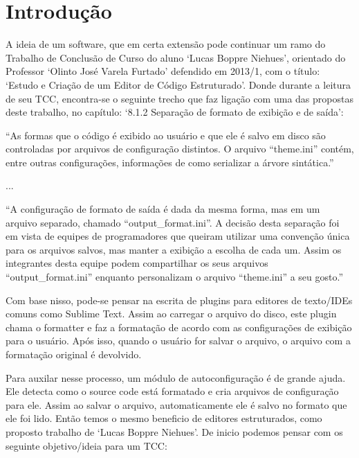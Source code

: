 



\section{Introdução}

    \hspace*{5mm}

    A ideia de um software, que em certa extensão pode continuar um ramo do Trabalho de Conclusão de
    Curso do aluno `Lucas Boppre Niehues', orientado do Professor `Olinto José Varela Furtado'
    defendido em 2013/1, com o título: `Estudo e Criação de um Editor de Código Estruturado'. Donde
    durante a leitura de seu TCC, encontra-se o seguinte trecho que faz ligação com uma das
    propostas deste trabalho, no capítulo: `8.1.2 Separação de formato de exibição e de saída':

    \medskip
    \begin{myquote}
    ``As formas que o código é exibido ao usuário e que ele é salvo em disco são controladas
    por arquivos de configuração distintos. O arquivo ``theme.ini'' contém, entre outras
    configurações, informações de como serializar a árvore sintática.''
    \end{myquote}

    \vspace{-5mm}
    ...
    \begin{myquote}
    ``A configuração de formato de saída é dada da mesma forma, mas em um arquivo
    separado, chamado ``output\_format.ini''. A decisão desta separação foi em vista de equipes
    de programadores que queiram utilizar uma convenção única para os arquivos salvos,
    mas manter a exibição a escolha de cada um. Assim os integrantes desta equipe podem
    compartilhar os seus arquivos ``output\_format.ini'' enquanto personalizam o arquivo
    ``theme.ini'' a seu gosto.''
    \end{myquote}

    Com base nisso, pode-se pensar na escrita de plugins para editores de texto/IDEs comuns como
    Sublime Text. Assim ao carregar o arquivo do disco, este plugin chama o formatter e faz a
    formatação de acordo com as configurações de exibição para o usuário. Após isso, quando o
    usuário for salvar o arquivo, o arquivo com a formatação original é devolvido.

    Para auxilar nesse processo, um módulo de autoconfiguração é de grande ajuda. Ele detecta como o
    source code está formatado e cria arquivos de configuração para ele. Assim ao salvar o arquivo,
    automaticamente ele é salvo no formato que ele foi lido. Então temos o mesmo beneficio de
    editores estruturados, como proposto trabalho de `Lucas Boppre Niehues'. De inicio podemos
    pensar com os seguinte objetivo/ideia para um TCC:

